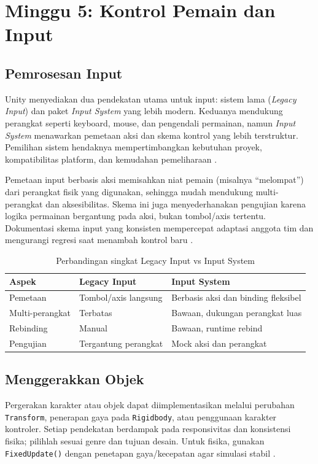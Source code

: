 \documentclass[../main.tex]{subfiles}
\begin{document}
\chapter{Minggu 5: Kontrol Pemain dan Input}

\section{Pemrosesan Input}
Unity menyediakan dua pendekatan utama untuk input: sistem lama (\textit{Legacy Input}) dan paket \textit{Input System} yang lebih modern. Keduanya mendukung perangkat seperti keyboard, mouse, dan pengendali permainan, namun \textit{Input System} menawarkan pemetaan aksi dan skema kontrol yang lebih terstruktur. Pemilihan sistem hendaknya mempertimbangkan kebutuhan proyek, kompatibilitas platform, dan kemudahan pemeliharaan \parencite{unity-input-legacy,unity-input-system}.

Pemetaan input berbasis aksi memisahkan niat pemain (misalnya \enquote{melompat}) dari perangkat fisik yang digunakan, sehingga mudah mendukung multi-perangkat dan aksesibilitas. Skema ini juga menyederhanakan pengujian karena logika permainan bergantung pada aksi, bukan tombol/axis tertentu. Dokumentasi skema input yang konsisten mempercepat adaptasi anggota tim dan mengurangi regresi saat menambah kontrol baru \parencite{unity-input-system}.

\begin{table}[h]
  \centering
  \caption{Perbandingan singkat Legacy Input vs Input System}
  \begin{tabularx}{\textwidth}{@{}lXX@{}}
    \toprule
    Aspek & Legacy Input & Input System \\
    \midrule
    Pemetaan & Tombol/axis langsung & Berbasis aksi dan binding fleksibel \\
    Multi-perangkat & Terbatas & Bawaan, dukungan perangkat luas \\
    Rebinding & Manual & Bawaan, runtime rebind \\
    Pengujian & Tergantung perangkat & Mock aksi dan perangkat \\
    \bottomrule
  \end{tabularx}
\end{table}

\section{Menggerakkan Objek}
Pergerakan karakter atau objek dapat diimplementasikan melalui perubahan \texttt{Transform}, penerapan gaya pada \texttt{Rigidbody}, atau penggunaan karakter kontroler. Setiap pendekatan berdampak pada responsivitas dan konsistensi fisika; pilihlah sesuai genre dan tujuan desain. Untuk fisika, gunakan \texttt{FixedUpdate()} dengan penetapan gaya/kecepatan agar simulasi stabil \parencite{unity-rigidbody,unity-transform}.
\end{document}
